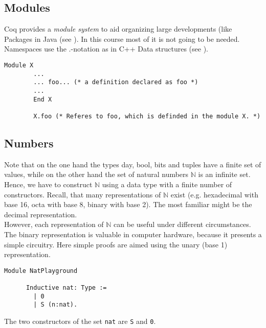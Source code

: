 	\subsection{Modules}
	\label{subsec:modules}
	
		Coq provides a {\itshape module system} to aid organizing large developments (like Packages in Java (see \cite[Section 3.6.5]{U}).
		In this course most of it is not going to be needed. Namespaces use the $.$-notation as in C++ Data structures (see \cite{CppDotComDS}).
	
		\begin{lstlisting}[caption = \lstinline!Module!]
		Module X 
		...
		... foo... (* a definition declared as foo *)
		...
		End X
		
		X.foo (* Referes to foo, which is definded in the module X. *)
		\end{lstlisting}
		
	\subsection{Numbers}
	\label{subsec:numbers}
	
	  Note that on the one hand the types day, bool, bits and tuples have a finite set of values, while on the other hand the set of natural numbers $\mathbb{N}$ is an infinite set.\\ 
	  Hence, we have to construct $\mathbb{N}$ using a data type with a finite number of constructors. 
	  Recall, that many representations of $\mathbb{N}$ exist (e.g. hexadecimal with base 16, octa with base 8, binary with base 2).
	  The most familiar might be the decimal representation.\\
	  However, each representation of $\mathbb{N}$ can be useful under different circumstances. 
	  The binary representation is valuable in computer hardware, because it presents a simple circuitry.
	  Here simple proofs are aimed using the unary (base 1) representation.
	  
	  \begin{lstlisting}[caption={\lstinline!nat!}, label=lst:DefNat]
	  Module NatPlayground
	  
	  Inductive nat: Type :=
	    | 0
	    | S (n:nat).
	  \end{lstlisting}  
	  The two constructors of the set \lstinline!nat! are \lstinline!S! and \lstinline!0!. \\
	
